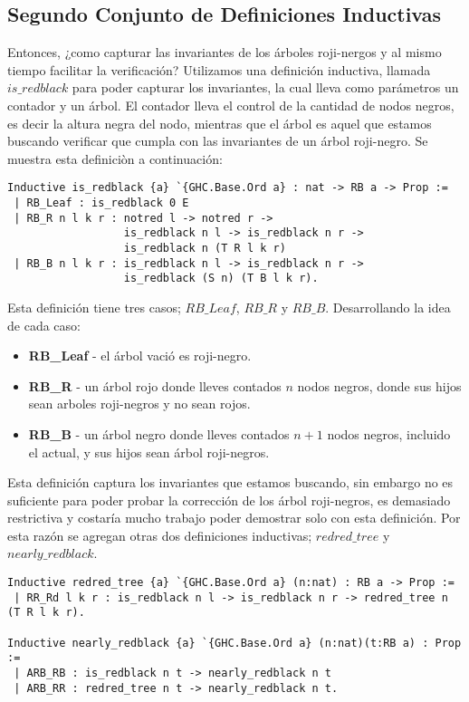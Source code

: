 \documentclass[letterpaper,12pt,oneside]{book}
\newcommand{\arn}{árbol roji-negro}
\newcommand{\arns}{arboles roji-negros}
\theoremstyle{plain}
\theoremstyle{definition}
\theoremstyle{remark}
\begin{document}
\subsection{Segundo Conjunto de Definiciones Inductivas}

Entonces, ¿como capturar las invariantes de los \'arboles roji-nergos y al mismo tiempo facilitar la verificaci\'on? 
Utilizamos una definición inductiva, llamada $is\_redblack$
para poder capturar los invariantes, la cual lleva como parámetros un contador y un \'arbol. El contador
lleva el control de la cantidad de nodos negros, es decir la altura negra del nodo, mientras que el \'arbol es aquel que estamos buscando
verificar que cumpla con las invariantes de un {\arn}. Se muestra esta definici\`on a continuaci\'on:

\begin{verbatim}
Inductive is_redblack {a} `{GHC.Base.Ord a} : nat -> RB a -> Prop :=
 | RB_Leaf : is_redblack 0 E
 | RB_R n l k r : notred l -> notred r ->
                  is_redblack n l -> is_redblack n r ->
                  is_redblack n (T R l k r)
 | RB_B n l k r : is_redblack n l -> is_redblack n r ->
                  is_redblack (S n) (T B l k r).
\end{verbatim}

Esta definici\'on tiene tres casos; $RB\_Leaf$, $RB\_R$ y $RB\_B$. Desarrollando la idea de cada caso:
\begin{itemize}
        \item \textbf{RB\_Leaf} - el árbol vació es roji-negro.
        \item \textbf{RB\_R} - un árbol rojo donde lleves contados $n$ nodos negros, donde sus hijos sean {\arns} y no sean rojos.
        \item \textbf{RB\_B} - un árbol negro donde lleves contados $n+1$ nodos negros, incluido el actual, y sus hijos sean {{{{\arn}}}s}.
\end{itemize}

Esta definici\'on captura los invariantes que estamos buscando, sin embargo no es suficiente para poder probar la correcci\'on de los {{{{\arn}}}s},
es demasiado restrictiva y costaría mucho trabajo poder demostrar solo con esta definici\'on. Por esta razón se agregan otras dos definiciones inductivas; $redred\_tree$ y $nearly\_redblack$. 

\begin{verbatim}
Inductive redred_tree {a} `{GHC.Base.Ord a} (n:nat) : RB a -> Prop :=
 | RR_Rd l k r : is_redblack n l -> is_redblack n r -> redred_tree n (T R l k r).

Inductive nearly_redblack {a} `{GHC.Base.Ord a} (n:nat)(t:RB a) : Prop :=
 | ARB_RB : is_redblack n t -> nearly_redblack n t
 | ARB_RR : redred_tree n t -> nearly_redblack n t.
\end{verbatim}
\end{document}
